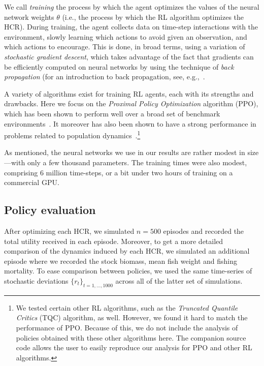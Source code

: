 \documentclass[floatfix,nofootinbib,longbibliography,notitlepage]{revtex4-2}
\begin{document}
We call \emph{training} the process by which the agent optimizes the values of the neural network weights $\theta$ (i.e., the process by which the RL algorithm optimizes the HCR). 
During training, the agent collects data on time-step interactions with the environment, slowly learning which actions to avoid given an observation, and which actions to encourage. 
This is done, in broad terms, using a variation of \emph{stochastic gradient descent}, which takes advantage of the fact that gradients can be efficiently computed on neural networks by using the technique of \emph{back propagation} (for an introduction to back propagation, see, e.g.,~\cite[Chapter~7]{rojas1996}.

A variety of algorithms exist for training RL agents, each with its strengths and drawbacks.
 Here we focus on the \emph{Proximal Policy Optimization} algorithm (PPO), which has been shown to perform well over a broad set of benchmark environments~\cite{schulman-ppo}. 
 It moreover has also been shown to have a strong performance in problems related to population dynamics~\cite{lapeyrolerie-rl,prettydarngood}.\footnote{
 We tested certain other RL algorithms, such as the \emph{Truncated Quantile Critics} (TQC) algorithm, as well. 
 However, we found it hard to match the performance of PPO. 
 Because of this, we do not include the analysis of policies obtained with these other algorithms here. 
 The companion source code allows the user to easily reproduce our analysis for PPO and other RL algorithms.
 }

 As mentioned, the neural networks we use in our results are rather modest in size—with only a few thousand parameters. 
 The training times were also modest, comprising 6 million time-steps, or a bit under two hours of training on a commercial GPU.


\subsection{Policy evaluation}

After optimizing each HCR, we simulated $n=500$ episodes and recorded the total utility received in each episode. 
Moreover, to get a more detailed comparison of the dynamics induced by each HCR, we simulated an additional episode where we recorded the stock biomass, mean fish weight and fishing mortality. 
To ease comparison between policies, we used the same time-series of stochastic deviations $\{r_t\}_{t=1,\dots,1000}$ across all of the latter set of simulations.
\end{document}
